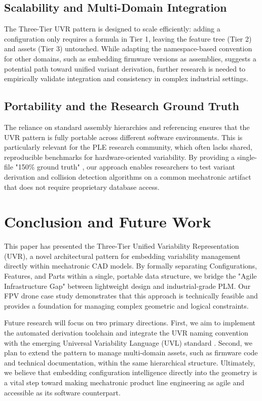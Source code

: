 \documentclass[runningheads]{llncs}
\begin{document}
\subsection{Scalability and Multi-Domain Integration}

The Three-Tier UVR pattern is designed to scale efficiently: adding a configuration only requires a formula in Tier 1, leaving the feature tree (Tier 2) and assets (Tier 3) untouched. While adapting the namespace-based convention for other domains, such as embedding firmware versions as assemblies, suggests a potential path toward unified variant derivation, further research is needed to empirically validate integration and consistency in complex industrial settings.

\subsection{Portability and the Research Ground Truth}

The reliance on standard assembly hierarchies and referencing ensures that the UVR pattern is fully portable across different software environments. This is particularly relevant for the PLE research community, which often lacks shared, reproducible benchmarks for hardware-oriented variability. By providing a single-file "150\% ground truth" \cite{Strueber2019}, our approach enables researchers to test variant derivation and collision detection algorithms on a common mechatronic artifact that does not require proprietary database access.

\section{Conclusion and Future Work}

This paper has presented the Three-Tier Unified Variability Representation (UVR), a novel architectural pattern for embedding variability management directly within mechatronic CAD models. By formally separating Configurations, Features, and Parts within a single, portable data structure, we bridge the "Agile Infrastructure Gap" between lightweight design and industrial-grade PLM. Our FPV drone case study demonstrates that this approach is technically feasible and provides a foundation for managing complex geometric and logical constraints.

Future research will focus on two primary directions. First, we aim to implement the automated derivation toolchain and integrate the UVR naming convention with the emerging Universal Variability Language (UVL) standard \cite{Benavides2025UVL}. Second, we plan to extend the pattern to manage multi-domain assets, such as firmware code and technical documentation, within the same hierarchical structure. Ultimately, we believe that embedding configuration intelligence directly into the geometry is a vital step toward making mechatronic product line engineering as agile and accessible as its software counterpart. 



\end{document}
